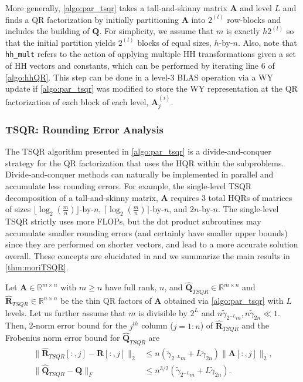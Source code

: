 \documentclass[review,onefignum,onetabnum]{siamart190516}
\newcommand{\R}{\mathbb{R}}
\newcommand{\bb}[1]{\mathbf{#1}}
\begin{document}
More generally, \cref{algo:par_tsqr} takes a tall-and-skinny matrix $\bb{A}$ and level $L$ and finds a QR factorization by initially partitioning $\bb{A}$ into $2^{(l)}$ row-blocks and includes the building of $\bb{Q}$.
For simplicity, we assume that $m$ is exactly $h2^{(l)}$ so that the initial partition yields $2^{(l)}$ blocks of equal sizes, $h$-by-$n$. 
Also, note that {\tt hh\_mult} refers to the action of applying multiple HH transformations given a set of HH vectors and constants, which can be performed by iterating line 6 of \cref{algo:hhQR}.
This step can be done in a level-3 BLAS operation via a WY update if \cref{algo:par_tsqr} was modified to store the WY representation at the QR factorization of each block of each level, $\bb{A}_j^{(i)}$. 

\subsubsection{TSQR: Rounding Error Analysis}
\label{sec:TSQRre}
The TSQR algorithm presented in \cref{algo:par_tsqr} is a divide-and-conquer strategy for the QR factorization that uses the HQR within the subproblems. 
Divide-and-conquer methods can naturally be implemented in parallel and accumulate less rounding errors.
For example, the single-level TSQR decomposition of a tall-and-skinny matrix, $\bb{A}$ requires 3 total HQRs of matrices of sizes $\lfloor\log_{2}(\frac{m}{n})\rfloor$-by-$n$, $\lceil\log_{2}(\frac{m}{n})\rceil$-by-$n$, and $2n$-by-$n$.
The single-level TSQR strictly uses more FLOPs, but the dot product subroutines may accumulate smaller rounding errors (and certainly have smaller upper bounds) since they are performed on shorter vectors, and lead to a more accurate solution overall.
These concepts are elucidated in \cite{Mori2012} and we summarize the main results  in \cref{thm:moriTSQR}.

\begin{theorem}
	\label{thm:moriTSQR}
	Let $\bb{A}\in\R^{m\times n}$ with $m\geq n$ have full rank, $n$, and $\hat{\bb{Q}}_{TSQR}\in\R^{m\times n}$ and $\hat{\bb{R}}_{TSQR}\in\R^{n\times n}$ be the thin QR factors of $\bb{A}$ obtained via \cref{algo:par_tsqr} with $L$ levels. 
	Let us further assume that $m$ is divisible by $2^L$ and $n\tilde{\gamma}_{2^{-L}m}, n\tilde{\gamma}_{ 2n} \ll 1$.
	Then, 2-norm error bound for the $j^{th}$ column ($j=1:n$) of $\hat{\bb{R}}_{TSQR}$ and the Frobenius norm error bound for $\hat{\bb{Q}}_{TSQR}$ are
	\begin{align}
	\|\hat{\bb{R}}_{TSQR}[:,j]-\bb{R}[:,j]\|_2 &\leq n(\tilde{\gamma}_{2^{-L}m} + L\tilde{\gamma}_{ 2n})\|\bb{A}[:,j]\|_2,  \label{eqn:tsqrRA}\\
	\|\hat{\bb{Q}}_{TSQR}-\bb{Q}\|_F &\leq n^{3/2}(\tilde{\gamma}_{2^{-L}m} + L\tilde{\gamma}_{ 2n}).\label{eqn:tsqrQ}
	\end{align}
\end{theorem}
\end{document}
